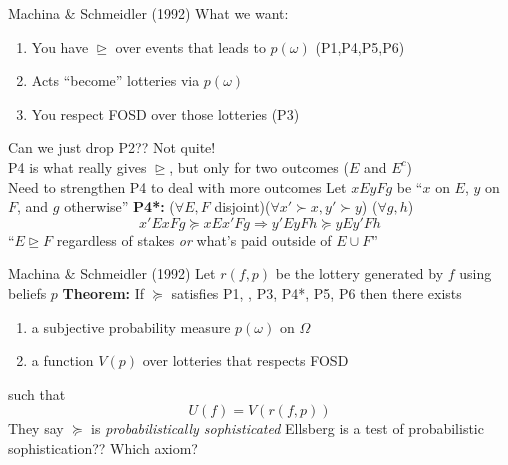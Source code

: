 \begin{frame}{Machina \& Schmeidler (1992)}
What we want:
\begin{enumerate}
    \item You have $\trianglerighteq$ over events that leads to $p(\omega)$ (P1,P4,P5,P6)
    \item Acts ``become'' lotteries via $p(\omega)$
    \item You respect FOSD over those lotteries (P3)
\end{enumerate}
\br
Can we just drop P2?? Not quite!\\
P4 is what really gives $\trianglerighteq$, but only for two outcomes ($E$ and $E^c$)\\
Need to strengthen P4 to deal with more outcomes 
\br
Let $xEyFg$ be ``$x$ on $E$, $y$ on $F$, and $g$ otherwise''
\br
\textbf{P4*:} ($\forall E,F$ disjoint)($\forall x'\succ x, y'\succ y$) ($\forall g,h$)
$$
    x'ExFg \succeq xEx'Fg \Rightarrow y'EyFh\succeq yEy'Fh
$$
``$E\trianglerighteq F$ regardless of stakes \textit{or} what's paid outside of $E\cup F$''
\end{frame}

\begin{frame}{Machina \& Schmeidler (1992)}
Let $r(f,p)$ be the lottery generated by $f$ using beliefs $p$
\br
\textbf{Theorem:}
If $\succeq$ satisfies P1, \phantom{P2}, P3, P4*, P5, P6 then there exists
\begin{enumerate}
    \item a subjective probability measure $p(\omega)$ on $\Omega$
    \item a function $V(p)$ over lotteries that respects FOSD
\end{enumerate}
such that
$$
    U(f) = V(r(f,p))
$$
\br
They say $\succeq$ is \textit{probabilistically sophisticated}
\br
Ellsberg is a test of probabilistic sophistication?? Which axiom?
\end{frame}

